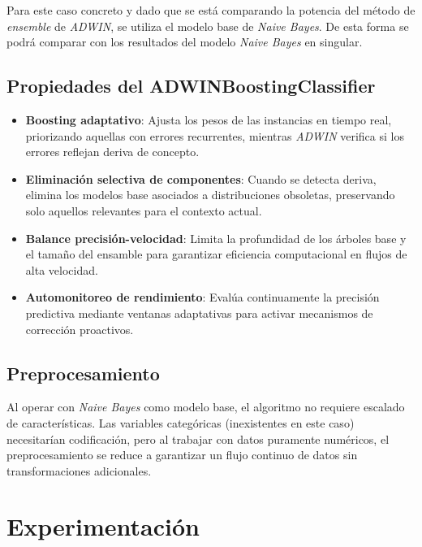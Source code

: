 \documentclass[12pt,letterpaper]{article}
\begin{document}
Para este caso concreto y dado que se está comparando la potencia del método de \textit{ensemble} de \textit{ADWIN}, se utiliza el modelo base de \textit{Naive Bayes}. De esta forma se podrá comparar con los resultados del modelo \textit{Naive Bayes} en singular.

\subsection{Propiedades del ADWINBoostingClassifier}
\begin{itemize}
    \item \textbf{Boosting adaptativo}: Ajusta los pesos de las instancias en tiempo real, priorizando aquellas con errores recurrentes, mientras \textit{ADWIN} verifica si los errores reflejan deriva de concepto.
    \item \textbf{Eliminación selectiva de componentes}: Cuando se detecta deriva, elimina los modelos base asociados a distribuciones obsoletas, preservando solo aquellos relevantes para el contexto actual.
    \item \textbf{Balance precisión-velocidad}: Limita la profundidad de los árboles base y el tamaño del ensamble para garantizar eficiencia computacional en flujos de alta velocidad.
    \item \textbf{Automonitoreo de rendimiento}: Evalúa continuamente la precisión predictiva mediante ventanas adaptativas para activar mecanismos de corrección proactivos.
\end{itemize}

\subsection{Preprocesamiento}
Al operar con \textit{Naive Bayes} como modelo base, el algoritmo no requiere escalado de características. Las variables categóricas (inexistentes en este caso) necesitarían codificación, pero al trabajar con datos puramente numéricos, el preprocesamiento se reduce a garantizar un flujo continuo de datos sin transformaciones adicionales.

\section{Experimentación}
\end{document}
